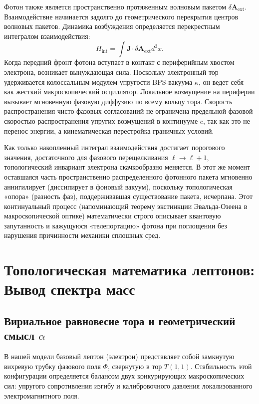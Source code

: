 \documentclass[12pt,a4paper]{article}
\begin{document}
Фотон также является пространственно протяженным волновым пакетом $\delta \mathbf{A}_{\text{ext}}$. Взаимодействие начинается задолго до геометрического перекрытия центров волновых пакетов. Динамика возбуждения определяется перекрестным интегралом взаимодействия:
\begin{equation}
	H_{\text{int}} = \int \mathbf{J} \cdot \delta \mathbf{A}_{\text{ext}} d^3x.
\end{equation}
Когда передний фронт фотона вступает в контакт с периферийным хвостом электрона, возникает вынуждающая сила. Поскольку электронный тор удерживается колоссальным модулем упругости BPS-вакуума $\kappa$, он ведет себя как жесткий макроскопический осциллятор. Локальное возмущение на периферии вызывает мгновенную фазовую диффузию по всему кольцу тора. 
Скорость распространения чисто фазовых согласований не ограничена предельной фазовой скоростью распространения упругих возмущений в континууме $c$, так как это не перенос энергии, а кинематическая перестройка граничных условий. 

Как только накопленный интеграл взаимодействия достигает порогового значения, достаточного для фазового перещелкивания $\ell \to \ell + 1$, топологический инвариант электрона скачкообразно меняется. В этот же момент оставшаяся часть пространственно распределенного фотонного пакета мгновенно аннигилирует (диссипирует в фоновый вакуум), поскольку топологическая «опора» (разность фаз), поддерживавшая существование пакета, исчерпана. 
Этот континуальный процесс (напоминающий теорему экстинкции Эвальда-Озеена в макроскопической оптике) математически строго описывает квантовую запутанность и кажущуюся «телепортацию» фотона при поглощении без нарушения причинности механики сплошных сред.

\section{Топологическая математика лептонов: Вывод спектра масс}

\subsection{Вириальное равновесие тора и геометрический смысл $\alpha$}
В нашей модели базовый лептон (электрон) представляет собой замкнутую вихревую трубку фазового поля $\Phi$, свернутую в тор $T(1,1)$. Стабильность этой конфигурации определяется балансом двух конкурирующих макроскопических сил: упругого сопротивления изгибу и калибровочного давления локализованного электромагнитного поля.
\end{document}
